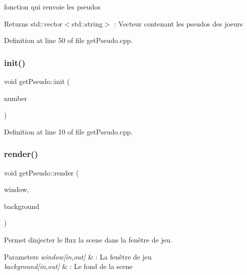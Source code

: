 fonction qui renvoie les pseudos 

\begin{DoxyReturn}{Returns}
std\+::vector$<$std\+::string$>$ \+: Vecteur contenant les pseudos des joeurs 
\end{DoxyReturn}


Definition at line 50 of file get\+Pseudo.\+cpp.

\mbox{\label{namespaceget_pseudo_a2118924f3d3476ec90731262ec241f3f}} 
\subsubsection{\texorpdfstring{init()}{init()}}
{\footnotesize\ttfamily void get\+Pseudo\+::init (\begin{DoxyParamCaption}\item[{unsigned}]{number }\end{DoxyParamCaption})}



Definition at line 10 of file get\+Pseudo.\+cpp.

\mbox{\label{namespaceget_pseudo_ab63637cb902211344de3d87e00e3758b}} 
\subsubsection{\texorpdfstring{render()}{render()}}
{\footnotesize\ttfamily void get\+Pseudo\+::render (\begin{DoxyParamCaption}\item[{\hyperlink{class_min_g_l}{Min\+GL} \&}]{window,  }\item[{\hyperlink{classns_gui_1_1_sprite}{ns\+Gui\+::\+Sprite} \&}]{background }\end{DoxyParamCaption})}



Permet d\textquotesingle{}injecter le flux la scene dans la fenêtre de jeu. 


\begin{DoxyParams}{Parameters}
{\em window\mbox{[}in,out\mbox{]}} & \+: La fenêtre de jeu \\
\hline
{\em background\mbox{[}in,out\mbox{]}} & \+: Le fond de la scene \\
\hline
\end{DoxyParams}



